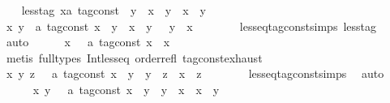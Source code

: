 \begin{isabellebody}
\isanewline
\ \ \isamarkupfalse%
\ less{\isacharunderscore}tag{\isacharcolon}\ {\isacartoucheopen}{\isacharparenleft}x{\isacharcolon}{\isacharcolon}{\isacharprime}a\ tag{\isacharunderscore}const{\isacharparenright}\ {\isacharless}\ y\ {\isasymlongleftrightarrow}\ {\isacharparenleft}x\ {\isasymle}\ y{\isacharparenright}\ {\isasymand}\ {\isacharparenleft}x\ {\isasymnoteq}\ y{\isacharparenright}{\isacartoucheclose}\isanewline
\isanewline
\ \ \isamarkupfalse%
%
\isadelimproof
\ %
\endisadelimproof
%
\isatagproof
{}\isamarkupfalse%
\isanewline
\ \ \ \ \isamarkupfalse%
\ {\isacartoucheopen}{\isasymAnd}x\ y\ {\isacharcolon}{\isacharcolon}\ {\isacharprime}a\ tag{\isacharunderscore}const{\isachardot}\ {\isacharparenleft}x\ {\isacharless}\ y{\isacharparenright}\ {\isacharequal}\ {\isacharparenleft}x\ {\isasymle}\ y\ {\isasymand}\ {\isasymnot}\ y\ {\isasymle}\ x{\isacharparenright}{\isacartoucheclose}\isanewline
\ \ \ \ \ \ \isamarkupfalse%
\ less{\isacharunderscore}eq{\isacharunderscore}tag{\isacharunderscore}const{\isachardot}simps\ less{\isacharunderscore}tag\ \isamarkupfalse%
\ auto\isanewline
\ \ \ \ \isamarkupfalse%
\ {\isacartoucheopen}{\isasymAnd}x\ \ {\isacharcolon}{\isacharcolon}\ {\isacharprime}a\ tag{\isacharunderscore}const{\isachardot}\ x\ {\isasymle}\ x{\isacartoucheclose}\isanewline
\ \ \ \ \ \ \isamarkupfalse%
\ {\isacharparenleft}metis\ {\isacharparenleft}full{\isacharunderscore}types{\isacharparenright}\ Int{\isacharunderscore}less{\isacharunderscore}eq\ order{\isacharunderscore}refl\ tag{\isacharunderscore}const{\isachardot}exhaust{\isacharparenright}\isanewline
\ \ \ \ \isamarkupfalse%
\ {\isacartoucheopen}{\isasymAnd}x\ y\ z\ \ {\isacharcolon}{\isacharcolon}\ {\isacharprime}a\ tag{\isacharunderscore}const{\isachardot}\ x\ {\isasymle}\ y\ {\isasymLongrightarrow}\ y\ {\isasymle}\ z\ {\isasymLongrightarrow}\ x\ {\isasymle}\ z{\isacartoucheclose}\isanewline
\ \ \ \ \ \ \isamarkupfalse%
\ less{\isacharunderscore}eq{\isacharunderscore}tag{\isacharunderscore}const{\isachardot}simps\ \isamarkupfalse%
\ auto\isanewline
\ \ \ \ \isamarkupfalse%
\ {\isacartoucheopen}{\isasymAnd}x\ y\ \ {\isacharcolon}{\isacharcolon}\ {\isacharprime}a\ tag{\isacharunderscore}const{\isachardot}\ x\ {\isasymle}\ y\ {\isasymLongrightarrow}\ y\ {\isasymle}\ x\ {\isasymLongrightarrow}\ x\ {\isacharequal}\ y{\isacartoucheclose}\isanewline
\ \ \ \ \ \ \isamarkupfalse%

\end{isabellebody}
